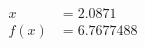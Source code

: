 \documentclass[preview]{standalone}
\begin{document}
\begin{align*}
x &= 2.0871\\f(x) &= 6.7677488
\end{align*}
\end{document}

